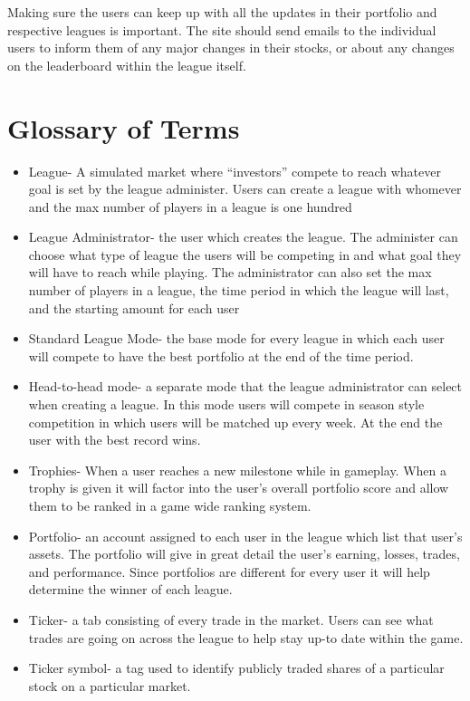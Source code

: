 \documentclass[11pt,letterpaper,oneside]{memoir}
\begin{document}
    Making sure the users can keep up with all the updates in their portfolio and respective leagues is important. The site should send emails to the individual users to inform them of any major changes in their stocks, or about any changes on the leaderboard within the league itself.  



\chapter{Glossary of Terms}
\begin{itemize}
\item League- A simulated market where “investors” compete to reach whatever goal is set by the league administer. Users can create a league with whomever and the max number of players in a league is one hundred 
\item League Administrator- the user which creates the league. The administer can choose what type of league the users will be competing in and what goal they will have to reach while playing. The administrator can also set the max number of players in a league, the time period in which the league will last, and the starting amount for each user
\item Standard League Mode- the base mode for every league in which each user will compete to have the best portfolio at the end of the time period.
\item Head-to-head mode- a separate mode that the league administrator can select when creating a league. In this mode users will compete in season style competition in which users will be matched up every week. At the end the user with the best record  wins.
\item Trophies- When a user reaches a new milestone while in gameplay. When a trophy is given it will factor into the user’s overall portfolio score and allow them to be ranked in a game wide ranking system. 
\item Portfolio- an account assigned to each user in the league which list that user’s assets. The portfolio will give in great detail the user’s earning, losses, trades, and performance. Since portfolios are different for every user it will help determine the winner of each league.  
\item Ticker- a tab consisting of every trade in the market. Users can see what trades are going on across the league to help stay up-to date within the game.  
\item Ticker symbol- a tag used to identify publicly traded shares of a particular stock on a particular market.

\end{itemize}
\end{document}
